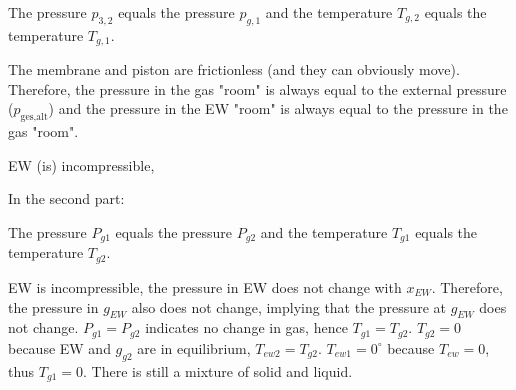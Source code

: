 The pressure \( p_{3,2} \) equals the pressure \( p_{g,1} \) and the temperature \( T_{g,2} \) equals the temperature \( T_{g,1} \).

The membrane and piston are frictionless (and they can obviously move). Therefore, the pressure in the gas "room" is always equal to the external pressure (\( p_{\text{ges,alt}} \)) and the pressure in the EW "room" is always equal to the pressure in the gas "room".

EW (is) incompressible,

In the second part:

The pressure \( P_{g1} \) equals the pressure \( P_{g2} \) and the temperature \( T_{g1} \) equals the temperature \( T_{g2} \).

EW is incompressible, the pressure in EW does not change with \( x_{EW} \). Therefore, the pressure in \( g_{EW} \) also does not change, implying that the pressure at \( g_{EW} \) does not change. \( P_{g1} = P_{g2} \) indicates no change in gas, hence \( T_{g1} = T_{g2} \). \( T_{g2} = 0 \) because EW and \( g_{g2} \) are in equilibrium, \( T_{ew2} = T_{g2} \). \( T_{ew1} = 0^\circ \) because \( T_{ew} = 0 \), thus \( T_{g1} = 0 \). There is still a mixture of solid and liquid.